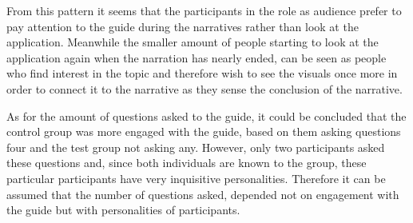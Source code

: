 From this pattern it seems that the participants in the role as audience prefer to pay attention to the guide during the narratives rather than look at the application. Meanwhile the smaller amount of people starting to look at the application again when the narration has nearly ended, can be seen as people who find interest in the topic and therefore wish to see the visuals once more in order to connect it to the narrative as they sense the conclusion of the narrative. 

As for the amount of questions asked to the guide, it could be concluded that the control group was more engaged with the guide, based on them asking questions four and the test group not asking any. However, only two participants asked these questions and, since both individuals are known to the group, these particular participants have very inquisitive personalities. Therefore it can be assumed that the number of questions asked, depended not on engagement with the guide but with personalities of participants. 

